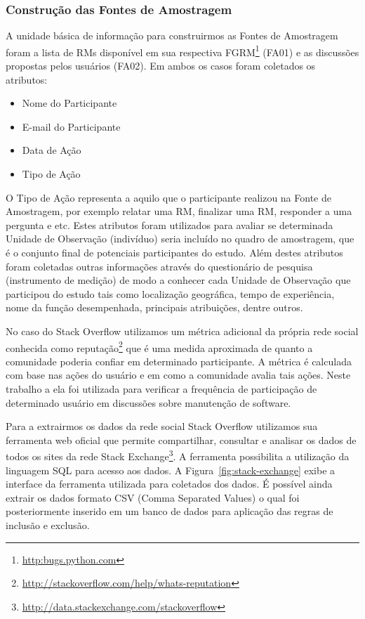 \subsubsection{Construção das Fontes de Amostragem}
\label{subsubsec:construcao_fonte_amostragem}

A unidade básica de informação para construirmos as Fontes de Amostragem foram a
lista de RMs disponível em sua respectiva
FGRM\footnote{\url{http:bugs.python.com}} (FA01) e as discussões propostas pelos
usuários (FA02). Em ambos os casos foram coletados os atributos:

\begin{itemize}
	\item Nome do Participante
	\item E-mail do Participante
	\item Data de Ação
	\item Tipo de Ação
\end{itemize}

O Tipo de Ação representa a aquilo que o participante realizou na Fonte de
Amostragem, por exemplo relatar uma RM, finalizar uma RM, responder a uma
pergunta e etc. Estes atributos foram utilizados para avaliar se determinada
Unidade de Observação (indivíduo) seria incluído no quadro de amostragem, que é
o conjunto final de potenciais participantes do estudo. Além destes atributos
foram coletadas outras informações através do questionário de pesquisa
(instrumento de medição) de modo a conhecer cada Unidade de Observação que
participou do estudo tais como localização geográfica, tempo de experiência,
nome da função desempenhada, principais atribuições, dentre outros.

No caso do Stack Overflow utilizamos um métrica adicional da própria rede social
conhecida como
reputação\footnote{\url{http://stackoverflow.com/help/whats-reputation}} que é
uma medida aproximada de quanto a comunidade poderia confiar em determinado
participante. A métrica é calculada com base nas ações do usuário e em como a
comunidade avalia tais ações. Neste trabalho a ela foi utilizada para verificar
a frequência de participação de determinado usuário em discussões sobre
manutenção de software.

Para a extrairmos os dados da rede social Stack Overflow utilizamos sua
ferramenta web oficial que permite compartilhar, consultar e analisar os dados
de todos os sites da rede Stack
Exchange\footnote{\url{http://data.stackexchange.com/stackoverflow}}. A
ferramenta possibilita a utilização da linguagem SQL para acesso aos dados. A
Figura~\ref{fig:stack-exchange} exibe a interface da ferramenta utilizada para
coletados dos dados. É possível ainda extrair os dados formato CSV (Comma
Separated Values) o qual foi posteriormente inserido em um banco de dados para
aplicação das regras de inclusão e exclusão.

